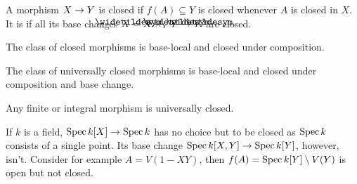 \documentclass[a4paper,parskip=half,numbers=enddot, DIV=12]{scrreprt}
\begin{document}
\begin{defi}
    A morphism $X\morphism Y$ is closed if $f(A)\subseteq Y$ is closed whenever $A$ is closed in $X$. It is  if all its base changes $\snake X = X\times_Y \snake Y \morphism \snake Y$ are closed.
\end{defi}
\begin{rem}
    \begin{alphanumerate}
    \item {}
        The class of closed morphisms is base-local and closed under composition.
    \item  
        The class of universally closed morphisms is base-local and closed under composition and base change.
    \item 
        Any finite or integral morphism is universally closed.
    \end{alphanumerate}
\end{rem}
\begin{example}
	If $k$ is a field, $\Spec k[X]\morphism\Spec k$ has no choice but to be closed as $\operatorname{Spec} k$ consists of a single point. Its base change $\Spec k[X,Y]\morphism\Spec k[Y]$, however, isn't. Consider for example $A=V(1-XY)$, then $f(A)=\operatorname{Spec} k[Y]\setminus V(Y)$ is open but not closed.
\end{example}
\end{document}
